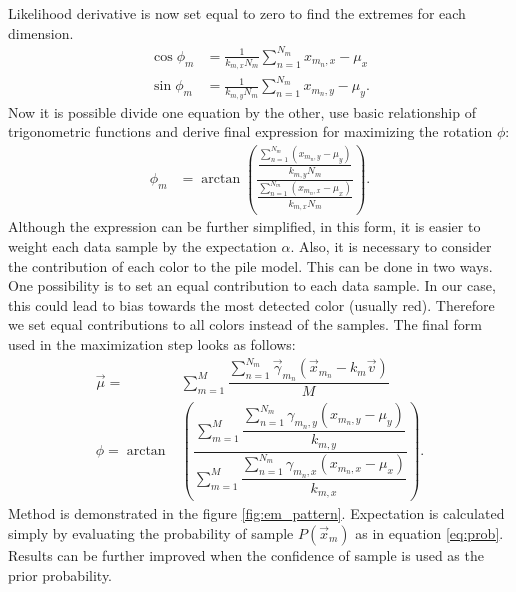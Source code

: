 Likelihood derivative is now set equal to zero to find the extremes for each dimension.
\begin{align}
\cos \phi_m &= \frac{1}{k_{m, x}N_m} \sum_{n = 1}^{N_m} x_{m_n, x} - \mu_x \\ 
\sin \phi_m &=  \frac{1}{k_{m, y}N_m} \sum_{n = 1}^{N_m} x_{m_n, y} - \mu_y .
\end{align}
Now it is possible divide one equation by the other, use basic relationship of trigonometric functions and derive final expression for maximizing the rotation $\phi$:
\begin{align}
\phi_m &= \arctan \left( \frac{\dfrac{\sum_{n = 1}^{N_m} \left( x_{m_n, y} - \mu_y \right)}{k_{m, y}N_m} }{ \dfrac{\sum_{n = 1}^{N_m} \left( x_{m_n, x} - \mu_x \right)}{k_{m, x}N_m} }\right).
\end{align}
Although the expression can be further simplified, in this form, it is easier to weight each data sample by the expectation $\alpha$. Also, it is necessary to consider the contribution of each color to the pile model. This can be done in two ways. One possibility is to set an equal contribution to each data sample. In our case, this could lead to bias towards the most detected color (usually red). Therefore we set equal contributions to all colors instead of the samples. The final form used in the maximization step looks as follows:
\begin{align}
\vec{\mu} =& \sum_{m=1}^M \dfrac{\sum_{n = 1}^{N_m}  \vec{\gamma}_{m_n} \left( \vec{x}_{m_n} - k_m \vec{v} \right) }{M} \\
\phi = \arctan & \left( \dfrac{\sum_{m=1}^{M} \dfrac{\sum_{n = 1}^{N_m} \gamma_{m_n, y}(x_{m_n, y} - \mu_y)}{k_{m, y} } }{\sum_{m=1}^{M} \dfrac{\sum_{n = 1}^{N_m} \gamma_{m_n, x} (x_{m_n, x} - \mu_x) }{k_{m, x}} }\right).
\end{align}
Method is demonstrated in the figure \ref{fig:em_pattern}. Expectation is calculated simply by evaluating the probability of sample $P(\vec{x}_m)$ as in equation \ref{eq:prob}. Results can be further improved when the confidence of sample is used as the prior probability.

